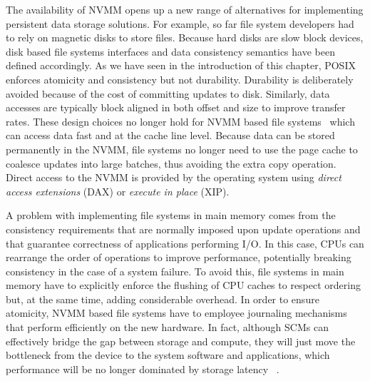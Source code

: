 The availability of NVMM opens up a new range of alternatives for implementing persistent data storage solutions. For example, so far file system developers had to rely on magnetic disks to store files. Because hard disks are 
slow block devices, disk based file systems interfaces and data consistency semantics have been defined accordingly. As we have seen in the introduction of this chapter, POSIX enforces atomicity and consistency but not durability. 
Durability is deliberately avoided because of the cost of committing updates to disk. Similarly, data accesses are typically block aligned in both offset and size to improve transfer rates. These design choices no longer hold 
for NVMM based file systems~\cite{Xu2016} which can access data fast and at the cache line level. Because data can be stored permanently in the NVMM, file systems no longer need to use the page cache to coalesce updates into large 
batches, thus avoiding the extra copy operation. Direct access to the NVMM is provided by the operating system using \textit{direct access extensions} (DAX) or \textit{execute in place} (XIP).

A problem with implementing file systems in main memory comes from the consistency requirements that are normally imposed upon update operations and that guarantee correctness of applications performing I/O. In this case, CPUs 
can rearrange the order of operations to improve performance, potentially breaking consistency in the case of a system failure. To avoid this, file systems in main memory have to explicitly enforce the flushing of CPU caches to 
respect ordering but, at the same time, adding considerable overhead. In order to ensure atomicity, NVMM based file systems have to employee journaling mechanisms that perform efficiently on the new hardware. In fact, although 
SCMs can effectively bridge the gap between storage and compute, they will just move the bottleneck from the device to the system software and applications, which performance will be no longer dominated by storage latency
~\cite{Katzburg2016}.

